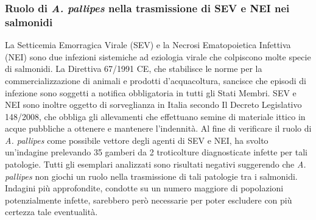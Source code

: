 \documentclass[11pt,a4paper,italian,twoside,openany]{memoir}
\begin{document}
\subsubsection{Ruolo di \emph{A. pallipes} nella trasmissione di SEV e NEI nei salmonidi}
La Setticemia Emorragica Virale (SEV) e la Necrosi Ematopoietica Infettiva (NEI) sono due infezioni sistemiche ad eziologia virale che colpiscono molte specie di salmonidi. La Direttiva 67/1991 CE, che stabilisce le norme per la commercializzazione di animali e prodotti d'acquacoltura, sancisce che episodi di infezione sono soggetti a notifica obbligatoria in tutti gli Stati Membri. SEV e NEI sono inoltre oggetto di sorveglianza in Italia secondo Il Decreto Legislativo 148/2008, che obbliga gli allevamenti che effettuano semine di materiale ittico in acque pubbliche a ottenere e mantenere l'indennità. Al fine di verificare il ruolo di \emph{A. pallipes} come possibile vettore degli agenti di SEV e NEI, \cite{Minghetti 2012b} ha svolto un'indagine prelevando 35 gamberi da 2 troticolture diagnosticate infette per tali patologie. Tutti gli esemplari analizzati sono risultati negativi suggerendo che \emph{A. pallipes} non giochi un ruolo nella trasmissione di tali patologie tra i salmonidi. Indagini più approfondite, condotte su un numero maggiore di popolazioni potenzialmente infette, sarebbero però necessarie per poter escludere con più certezza tale eventualità.
\end{document}
